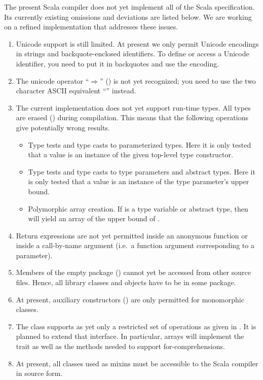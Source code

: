 
The present Scala compiler does not yet implement all of the Scala
specification. Its currently existing omissions and deviations are
listed below. We are working on a refined implementation that
addresses these issues.
\begin{enumerate}
\item
Unicode support is still limited. At present we only permit Unicode
encodings \verb@\uXXXX@ in strings and backquote-enclosed identifiers.
To define or access a Unicode identifier, you need to put it in
backquotes and use the \verb@\uXXXX@ encoding.
\item 
The unicode operator ``$\Rightarrow$''
() is not yet recognized; you need to use the two
character ASCII equivalent ``\code{=>}'' instead.
\item
The current implementation does not yet support run-time types.
All types are erased () during compilation. This means that
the following operations give potentially wrong results.
\begin{itemize}
\item
Type tests and type casts to parameterized types. Here it is only tested
that a value is an instance of the given top-level type constructor.
\item
Type tests and type casts to type parameters and abstract types.  Here
it is only tested that a value is an instance of the type parameter's upper bound.  
\item
Polymorphic array creation. If  is a type variable or abstract type, then
 will yield an array of the upper bound of .
\end{itemize}
\item
Return expressions are not yet permitted inside an anonymous function
or inside a call-by-name argument (i.e.\ a function argument corresponding to a 
 parameter).
\item
Members of the empty package () cannot yet be
accessed from other source files.  Hence, all library classes and
objects have to be in some package.
\item
At present, auxiliary constructors () are only permitted
for monomorphic classes.
\item
The  class supports as yet only a restricted set of
operations as given in . It is planned to extend that
interface. In particular, arrays will implement the 
trait as well as the methods needed to support for-comprehensions.
\item
At present, all classes used as mixins must be accessible to the Scala
compiler in source form.
\end{enumerate}
